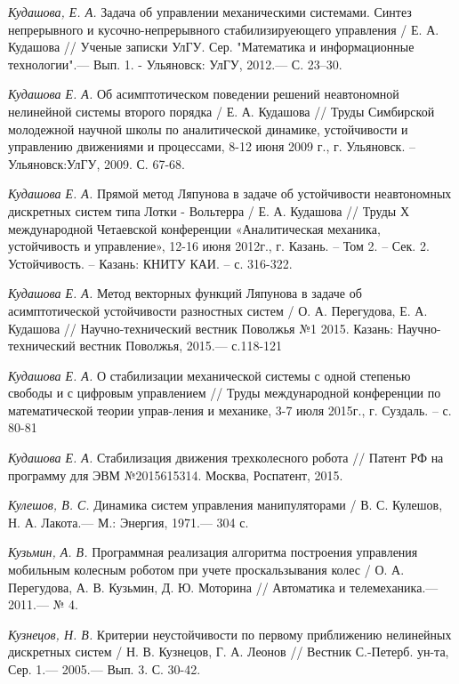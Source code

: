 \begin{thebibliography}{10}
	{\it Кудашова, Е. А.} Задача об управлении механическими системами. Синтез непрерывного и кусочно-непрерывного стабилизируеющего управления / Е. А. Кудашова // Ученые записки УлГУ. Сер. "Математика и информационные технологии".— Вып. 1. - Ульяновск: УлГУ, 2012.— С. 23–30.
	
	{\it Кудашова Е. А.} Об асимптотическом поведении решений неавтономной нелинейной системы второго порядка / Е. А. Кудашова //
	Труды Симбирской молодежной научной школы по аналитической динамике, устойчивости и управлению движениями и процессами, 8-12 июня 2009 г., г. Ульяновск. –Ульяновск:УлГУ, 2009. С. 67-68.
	
	{\it Кудашова Е. А.} Прямой метод Ляпунова в задаче об устойчивости неавтономных дискретных систем типа Лотки - Вольтерра / Е. А. Кудашова //
	Труды Х международной Четаевской конференции «Аналитическая механика, устойчивость и управление», 12-16 июня 2012г., г. Казань. – Том 2. – Сек. 2. Устойчивость. – Казань: КНИТУ КАИ. – с. 316-322.
	
	{\it Кудашова Е. А.} Метод векторных функций Ляпунова в задаче об асимптотической устойчивости разностных систем / О. А. Перегудова, Е. А. Кудашова //
	Научно-технический вестник Поволжья №1 2015. Казань: Научно-технический вестник Поволжья, 2015.— с.118-121


{\it Кудашова Е. А.} О стабилизации механической системы с одной степенью свободы и с цифровым управлением // Труды международной конференции по математической теории управ-ления и механике, 3-7 июля 2015г., г. Суздаль. – с. 80-81

{\it Кудашова Е. А.} Стабилизация движения трехколесного робота //  Патент РФ на программу для ЭВМ №2015615314. Москва, Роспатент, 2015. 

	
	{\it Кулешов, В. С.} Динамика систем управления манипуляторами / В. С. Кулешов,
	Н. А. Лакота.— М.: Энергия, 1971.— 304 с.
	
	{\it Кузьмин, А. В.} Программная реализация алгоритма построения управления мобильным колесным роботом при учете проскальзывания колес / О. А. Перегудова, А. В. Кузьмин, Д. Ю. Моторина // Автоматика и телемеханика.—  2011.— № 4.
	
	{\it Кузнецов, Н. В.} Критерии неустойчивости по первому приближению нелинейных дискретных систем / Н. В. Кузнецов, Г. А. Леонов // Вестник С.-Петерб. ун-та, Сер. 1.—  2005.— Вып. 3. С. 30-42.
	

\end{thebibliography}
